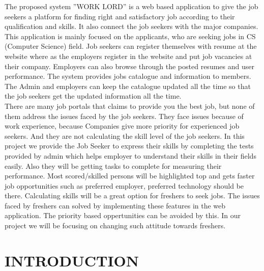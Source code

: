 \documentclass[a4paper,12pt]{report}
\begin{document}
The proposed system ”WORK LORD” is a web based application to give the
job seekers a platform for finding right and satisfactory job according to their qualification and skills. It also connect the job seekers with the major companies. This application is mainly focused on the applicants, who are seeking jobs in CS (Computer
Science) field. Job seekers can register themselves with resume at the website where as the
employers register in the website and put job vacancies at their
company. Employers can also browse through the posted resumes and user performance. The system provides jobs catalogue and information to members. The Admin and employers can
keep the catalogue updated all the time so that the job seekers get the updated information all the time.\\

There are many job portals that claims to provide you the best job, but none
of them address the issues faced by the job seekers. They face issues because of work experience, because Companies give more priority for experienced job seekers. And they are not calculating the skill level of the job seekers. In this project we provide the Job Seeker to express their skills by completing the tests provided by admin which helps employer to understand their skills in their fields easily. Also they will
be getting tasks to complete for measuring their performance. Most
scored/skilled persons will be highlighted top and gets faster job opportunities such as preferred employer, preferred technology should be there. Calculating skills will be a great option for freshers to seek jobs. The issues faced by freshers can solved by implementing these features in the web application. The priority based oppertunities can be avoided by this. In our project we will be focusing on changing
such attitude towards freshers.\\


\pagebreak

\tableofcontents{}
\pagebreak


\pagebreak

\listoffigures

\pagebreak

\listoftables

\pagebreak
{}

\chapter{INTRODUCTION}
\end{document}
